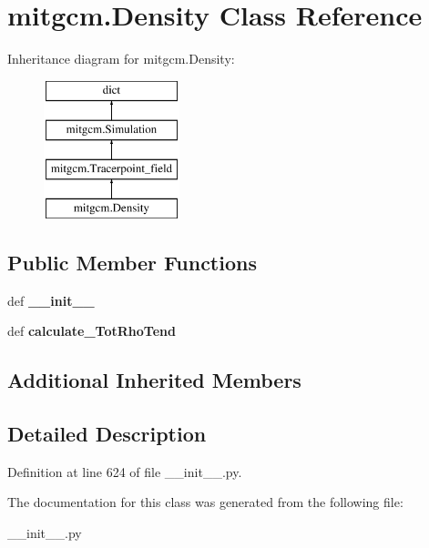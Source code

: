 \hypertarget{classmitgcm_1_1Density}{\section{mitgcm.\+Density Class Reference}
\label{classmitgcm_1_1Density}
}
Inheritance diagram for mitgcm.\+Density\+:\begin{figure}[H]
\begin{center}
\leavevmode
\includegraphics[height=4.000000cm]{classmitgcm_1_1Density}
\end{center}
\end{figure}
\subsection*{Public Member Functions}
\begin{DoxyCompactItemize}
\item 
\hypertarget{classmitgcm_1_1Density_aebdb54f40c181a305136c8d877c188d1}{def {\bfseries \+\_\+\+\_\+init\+\_\+\+\_\+}}\label{classmitgcm_1_1Density_aebdb54f40c181a305136c8d877c188d1}

\item 
\hypertarget{classmitgcm_1_1Density_a8838db86600856226b8856ae1b0ab7e6}{def {\bfseries calculate\+\_\+\+Tot\+Rho\+Tend}}\label{classmitgcm_1_1Density_a8838db86600856226b8856ae1b0ab7e6}

\end{DoxyCompactItemize}
\subsection*{Additional Inherited Members}


\subsection{Detailed Description}


Definition at line 624 of file \+\_\+\+\_\+init\+\_\+\+\_\+.\+py.



The documentation for this class was generated from the following file\+:\begin{DoxyCompactItemize}
\item 
\+\_\+\+\_\+init\+\_\+\+\_\+.\+py\end{DoxyCompactItemize}

